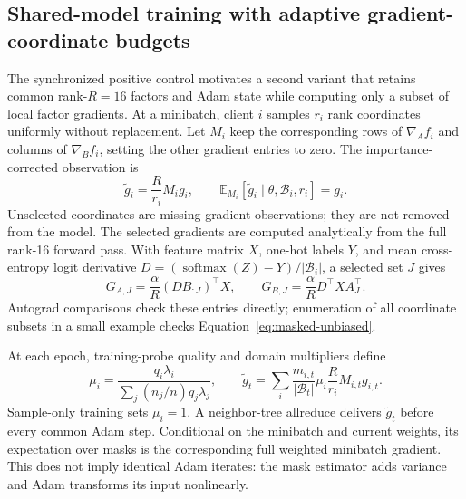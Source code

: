 \documentclass[11pt]{article}
\begin{document}
\subsection{Shared-model training with adaptive gradient-coordinate budgets}
The synchronized positive control motivates a second variant that retains common rank-$R=16$ factors and Adam state while computing only a subset of local factor gradients. At a minibatch, client $i$ samples $r_i$ rank coordinates uniformly without replacement. Let $M_i$ keep the corresponding rows of $\nabla_A f_i$ and columns of $\nabla_B f_i$, setting the other gradient entries to zero. The importance-corrected observation is
\begin{equation}
 \widetilde g_i=\frac{R}{r_i}M_i g_i,\qquad
 \mathbb E_{M_i}[\widetilde g_i\mid\theta,\mathcal B_i,r_i]=g_i.
 \label{eq:masked-unbiased}
\end{equation}
Unselected coordinates are missing gradient observations; they are not removed from the model. The selected gradients are computed analytically from the full rank-16 forward pass. With feature matrix $X$, one-hot labels $Y$, and mean cross-entropy logit derivative $D=(\operatorname{softmax}(Z)-Y)/|\mathcal B_i|$, a selected set $J$ gives
\begin{equation}
 G_{A,J}=\frac{\alpha}{R}(DB_{:J})^\top X,\qquad
 G_{B,J}=\frac{\alpha}{R}D^\top XA_J^\top.
 \label{eq:partial-gradients}
\end{equation}
Autograd comparisons check these entries directly; enumeration of all coordinate subsets in a small example checks Equation~\eqref{eq:masked-unbiased}.

At each epoch, training-probe quality and domain multipliers define
\begin{equation}
 \mu_i=\frac{q_i\lambda_i}{\sum_j(n_j/n)q_j\lambda_j},\qquad
 \widetilde g_t=\sum_i\frac{m_{i,t}}{|\mathcal B_t|}\mu_i
 \frac{R}{r_i}M_{i,t}g_{i,t}.
 \label{eq:masked-aggregate}
\end{equation}
Sample-only training sets $\mu_i=1$. A neighbor-tree allreduce delivers $\widetilde g_t$ before every common Adam step. Conditional on the minibatch and current weights, its expectation over masks is the corresponding full weighted minibatch gradient. This does not imply identical Adam iterates: the mask estimator adds variance and Adam transforms its input nonlinearly.
\end{document}
